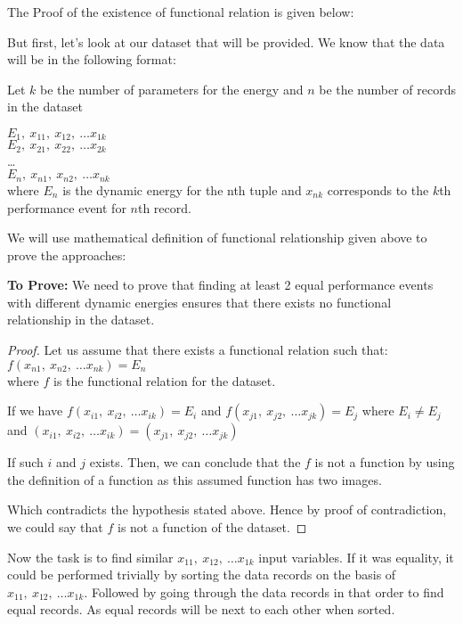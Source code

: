 The Proof of the existence of functional relation is given below:

But first, let's look at our dataset that will be provided.
We know that the data will be in the following format:

Let \(k\) be the number of parameters for the energy and \(n\) be the number of records in the dataset

\(E_1,\ x_{11},\ x_{12},\ \ldots x_{1k}\)\\
\(E_2,\ x_{21},\ x_{22},\ \ldots x_{2k}\)\\
\ldots\\
\(E_n,\ x_{n1},\ x_{n2},\ \ldots x_{nk}\)\\
where \(E_n\) is the dynamic energy for the nth tuple and \(x_{nk}\) corresponds to the \(k\)th performance event for \(n\)th record.

We will use mathematical definition of functional relationship given above to prove the approaches:

\textbf{To Prove:} We need to prove that finding at least 2 equal performance events with different dynamic energies ensures that there exists no functional relationship in the dataset.

\begin{proof}
    Let us assume that there exists a functional relation such that:\\
    \(f(x_{n1},\ x_{n2},\ \ldots x_{nk}) = E_n\)\\
    where \(f\) is the functional relation for the dataset.

    If we have \(f(x_{i1},\ x_{i2},\ \ldots x_{ik}) = E_i\) and \(f(x_{j1},\ x_{j2},\ \ldots x_{jk}) = E_j\)
    where \(E_i \neq E_j\) and \((x_{i1},\ x_{i2},\ \ldots x_{ik}) = (x_{j1},\ x_{j2},\ \ldots x_{jk})\)

    If such \(i\) and \(j\) exists. Then, we can conclude that the \(f\) is not a function by using the definition of a function as this assumed function has two images.

    Which contradicts the hypothesis stated above.
    Hence by proof of contradiction, we could say that \(f\) is not a function of the dataset.
\end{proof}

Now the task is to find similar \(x_{11},\ x_{12},\ \ldots x_{1k}\) input variables. If it was equality, it could be performed trivially by sorting the data records on the basis of \(x_{11},\ x_{12},\ \ldots x_{1k}\). Followed by going through the data records in that order to find equal records. As equal records will be next to each other when sorted.

